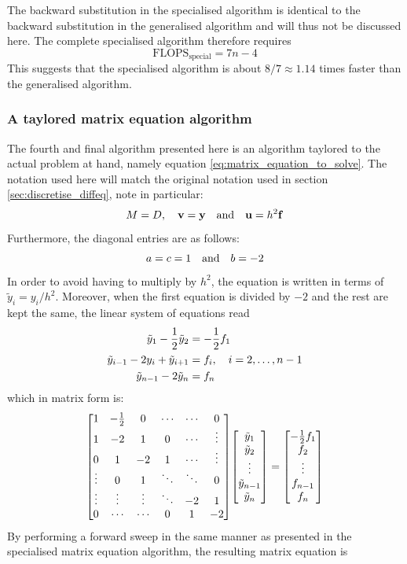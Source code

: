 \documentclass[reprint,english]{revtex4-1}
\begin{document}
The backward substitution in the specialised algorithm is identical to the backward substitution in the generalised algorithm and will thus not be discussed here. The complete specialised algorithm therefore requires
\begin{equation}
\text{FLOPS}_{\text{special}}=7n-4
\end{equation}
This suggests that the specialised algorithm is about \(8/7\approx1.14\) times faster than the generalised algorithm.
\subsubsection{A taylored matrix equation algorithm}
The fourth and final algorithm presented here is an algorithm taylored to the actual problem at hand, namely equation \eqref{eq:matrix_equation_to_solve}. The notation used here will match the original notation used in section \ref{sec:discretise_diffeq}, note in particular:
\[M=D\qc\vb{v}=\vb{y}\qand\vb{u}=h^2\vb{f}\]
Furthermore, the diagonal entries are as follows:
\[a=c=1\qand b=-2\]
In order to avoid having to multiply by \(h^2\), the equation is written in terms of \(\tilde{y}_i=y_i/h^2\). Moreover, when the first equation is divided by \(-2\) and the rest are kept the same, the linear system of equations read
\begin{align*}
\tilde{y}_1-\frac{1}{2}\tilde{y}_2&=-\frac{1}{2}f_1\\
\tilde{y}_{i-1}-2y_i+\tilde{y}_{i+1}&=f_i\qc i=2,\ldots,n-1\\
\tilde{y}_{n-1}-2\tilde{y}_n&=f_n
\end{align*}
which in matrix form is:
\[\mqty[1 & -\frac{1}{2} & 0 & \cdots & \cdots & 0 \\
1 & -2 & 1 & 0 & \cdots & \vdots \\
0 & 1 & -2 & 1 & \cdots & \vdots \\
\vdots & 0 & 1 & \ddots & \ddots & 0 \\
\vdots & \vdots & \vdots & \ddots & -2 & 1 \\
0 & \cdots & \cdots & 0 & 1 & -2]\mqty[\tilde{y}_1 \\ \tilde{y}_2 \\ \vdots \\ \tilde{y}_{n-1} \\ \tilde{y}_n]=\mqty[-\frac{1}{2}f_1 \\ f_2 \\ \vdots \\ f_{n-1} \\ f_n]\]
By performing a forward sweep in the same manner as presented in the specialised matrix equation algorithm, the resulting matrix equation is
\end{document}
